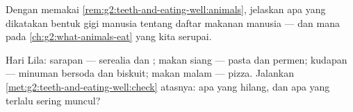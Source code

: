 \begin{exercise}[$\star\star$]\label{exo:g2:teeth-and-eating-well:9}
Dengan memakai \cref{rem:g2:teeth-and-eating-well:animals}, jelaskan
apa yang dikatakan bentuk gigi manusia tentang daftar makanan manusia
--- dan  mana pada \cref{ch:g2:what-animals-eat} yang kita
serupai.
\end{exercise}

\begin{exercise}[$\star\star$]\label{exo:g2:teeth-and-eating-well:10}
Hari Lila: sarapan --- serealia dan ; makan siang --- pasta dan
permen; kudapan --- minuman bersoda dan biskuit; makan malam --- pizza.
Jalankan \cref{met:g2:teeth-and-eating-well:check} atasnya: apa yang
hilang, dan apa yang terlalu sering muncul?
\end{exercise}

